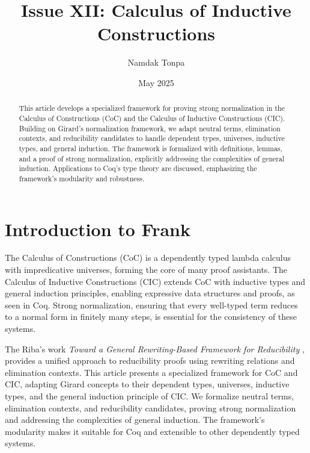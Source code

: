 \documentclass{article}
\begin{document}
\title{Issue XII: Calculus of Inductive Constructions}
\author{Namdak Tonpa}
\date{May 2025}

\maketitle


\begin{abstract}
This article develops a specialized framework for proving strong normalization
in the Calculus of Constructions (CoC) and the Calculus of Inductive Constructions (CIC).
Building on Girard’s normalization framework, we adapt neutral terms,
elimination contexts, and reducibility candidates to handle dependent types,
universes, inductive types, and general induction. The framework is formalized
with definitions, lemmas, and a proof of strong normalization, explicitly
addressing the complexities of general induction. Applications to Coq’s type
theory are discussed, emphasizing the framework’s modularity and robustness.
\end{abstract}

\ifincludeTOC
  \tableofcontents
\else
\fi


\section{Introduction to Frank}

The Calculus of Constructions (CoC) \cite{coquand1988} is a dependently typed
lambda calculus with impredicative universes, forming the core of many proof assistants.
The Calculus of Inductive Constructions (CIC) \cite{coquand1990} extends CoC with inductive
types and general induction principles, enabling expressive data structures and proofs,
as seen in Coq. Strong normalization, ensuring that every well-typed term reduces to
a normal form in finitely many steps, is essential for the consistency of these systems.

The Riba’s work \emph{Toward a General Rewriting-Based Framework for Reducibility} \cite{riba2008},
provides a unified approach to reducibility proofs using rewriting relations and elimination contexts.
This article presents a specialized framework for CoC and CIC, adapting Girard concepts
to their dependent types, universes, inductive types, and the general induction principle of CIC.
We formalize neutral terms, elimination contexts, and reducibility candidates,
proving strong normalization and addressing the complexities of general induction.
The framework’s modularity makes it suitable for Coq and extensible to other dependently typed systems.
\end{document}
